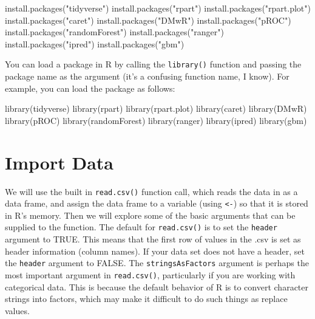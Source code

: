 \documentclass[
]{book}
\newenvironment{Shaded}{\begin{snugshade}}{\end{snugshade}}
\newcommand{\FunctionTok}[1]{\textcolor[rgb]{0.00,0.00,0.00}{#1}}
\newcommand{\NormalTok}[1]{#1}
\newcommand{\StringTok}[1]{\textcolor[rgb]{0.31,0.60,0.02}{#1}}
\begin{document}
\begin{Shaded}
\begin{Highlighting}[]
\FunctionTok{install.packages}\NormalTok{(}\StringTok{"tidyverse"}\NormalTok{)}
\FunctionTok{install.packages}\NormalTok{(}\StringTok{"rpart"}\NormalTok{)}
\FunctionTok{install.packages}\NormalTok{(}\StringTok{"rpart.plot"}\NormalTok{)}
\FunctionTok{install.packages}\NormalTok{(}\StringTok{"caret"}\NormalTok{)}
\FunctionTok{install.packages}\NormalTok{(}\StringTok{"DMwR"}\NormalTok{)}
\FunctionTok{install.packages}\NormalTok{(}\StringTok{"pROC"}\NormalTok{)}
\FunctionTok{install.packages}\NormalTok{(}\StringTok{"randomForest"}\NormalTok{)}
\FunctionTok{install.packages}\NormalTok{(}\StringTok{"ranger"}\NormalTok{)}
\FunctionTok{install.packages}\NormalTok{(}\StringTok{"ipred"}\NormalTok{)}
\FunctionTok{install.packages}\NormalTok{(}\StringTok{"gbm"}\NormalTok{)}
\end{Highlighting}
\end{Shaded}

You can load a package in R by calling the \texttt{library()} function and passing the package name as the argument (it's a confusing function name, I know). For example, you can load the package as follows:

\begin{Shaded}
\begin{Highlighting}[]
\FunctionTok{library}\NormalTok{(tidyverse)}
\FunctionTok{library}\NormalTok{(rpart)}
\FunctionTok{library}\NormalTok{(rpart.plot)}
\FunctionTok{library}\NormalTok{(caret)}
\FunctionTok{library}\NormalTok{(DMwR)}
\FunctionTok{library}\NormalTok{(pROC)}
\FunctionTok{library}\NormalTok{(randomForest)}
\FunctionTok{library}\NormalTok{(ranger)}
\FunctionTok{library}\NormalTok{(ipred)}
\FunctionTok{library}\NormalTok{(gbm)}
\end{Highlighting}
\end{Shaded}

\hypertarget{import-data}{%
\section{Import Data}\label{import-data}}

We will use the built in \texttt{read.csv()} function call, which reads the data in as a data frame, and assign the data frame to a variable (using \texttt{\textless{}-}) so that it is stored in R's memory. Then we will explore some of the basic arguments that can be supplied to the function. The default for \texttt{read.csv()} is to set the \texttt{header} argument to TRUE. This means that the first row of values in the .csv is set as header information (column names). If your data set does not have a header, set the \texttt{header} argument to FALSE. The \texttt{stringsAsFactors} argument is perhaps the most important argument in \texttt{read.csv()}, particularly if you are working with categorical data. This is because the default behavior of R is to convert character strings into factors, which may make it difficult to do such things as replace values.
\end{document}
